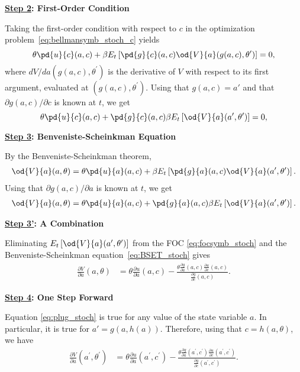 \documentclass[\topdir/lecture\_notes.tex]{subfiles}
\begin{document}
\textbf{\underline{Step 2}: First-Order Condition}

Taking the first-order condition with respect to $c$ in the optimization problem~\eqref{eq:bellmansymb_stoch_c} yields 
\begin{equation}
\theta \pd{u}{c}(a,c)+\beta E_t\left[ \pd{g}{c}(a,c) \od{V}{a}(g(a,c),\theta^\prime)\right]=0,
\end{equation}
where $dV/da(g(a,c),\theta^\prime)$ is the derivative of $V$ with respect to its first argument, evaluated at $(g(a,c),\theta^\prime)$. Using that $g(a,c)=a'$ and that $\partial g(a,c)/\partial c$ is known at $t$, we get
\begin{equation}
\theta \pd{u}{c}(a,c)+\pd{g}{c}(a,c) \beta E_t\left[  \od{V}{a}(a',\theta^\prime)\right]=0,\label{eq:focsymb_stoch}
\end{equation}

\textbf{\underline{Step 3}: Benveniste-Scheinkman Equation}

By the Benveniste-Scheinkman theorem,
\begin{align}
\od{V}{a}(a,\theta)=\theta\pd{u}{a}(a,c)+\beta E_t \left[\pd{g}{a}(a,c) \od{V}{a}(a',\theta') \right].
\end{align}
Using that $\partial g(a,c)/\partial a$ is known at $t$, we get
\begin{align}
\od{V}{a}(a,\theta)=\theta\pd{u}{a}(a,c)+\pd{g}{a}(a,c) \beta E_t \left[ \od{V}{a}(a',\theta') \right].\label{eq:BSET_stoch}
\end{align}

\textbf{\underline{Step 3'}: A Combination}

Eliminating $E_t\left[ \od{V}{a}(a',\theta') \right]$ from the FOC \eqref{eq:focsymb_stoch} and the Benveniste-Scheinkman equation~\eqref{eq:BSET_stoch} gives
\begin{align}
\frac{\partial V}{\partial a}(a,\theta)&=\theta\frac{\partial u}{\partial a}(a,c)-\frac{\theta\frac{\partial g}{\partial a}(a,c)\frac{\partial u}{\partial c}(a,c)}{\frac{\partial g}{\partial c}(a,c)}.\label{eq:plug_stoch}
\end{align}

\textbf{\underline{Step 4}: One Step Forward}

Equation \eqref{eq:plug_stoch} is true for any value of the state variable $a$. In particular, it is true for $a'=g(a,h(a))$. Therefore, using that $c = h(a,\theta)$, we have
\begin{align}
\frac{\partial V}{\partial a}(a^{\prime},\theta^{\prime})&=\theta\frac{\partial u}{\partial a}(a^{\prime},c^{\prime})-\frac{\theta\frac{\partial g}{\partial a}(a^{\prime},c^{\prime})\frac{\partial u}{\partial c}(a^{\prime},c^{\prime})}{\frac{\partial g}{\partial c}(a^{\prime},c^{\prime})}.\label{eq:onestep_stoch}
\end{align}
\end{document}
